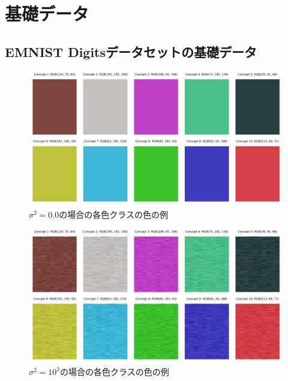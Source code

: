 \chapter{基礎データ}
\label{付録}

\section{EMNIST Digitsデータセットの基礎データ}
\begin{figure}[H]
    \centering
    \includegraphics[width=\linewidth]{fig/color_varinace/0.pdf}
    \caption{$\sigma^2 = 0.0$の場合の各色クラスの色の例}
    \label{fig:variance_0}
\end{figure}

\begin{figure}[H]
    \centering
    \includegraphics[width=\linewidth]{fig/color_varinace/1000.pdf}
    \caption{$\sigma^2 = 10^3$の場合の各色クラスの色の例}
    \label{fig:variance_1000}
\end{figure}

